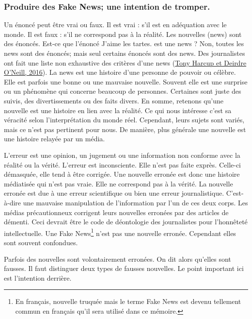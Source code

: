 \subsubsection{Produire des Fake News; une intention de tromper.}

Un énoncé peut être vrai ou faux.
Il est vrai : s'il est en adéquation avec le monde.
Il est faux : s'il ne correspond pas à la réalité.
Les nouvelles (news) sont des énoncés.
Est-ce que l'énoncé \og J'aime les tartes. \fg  est une news ?
Non, toutes les news sont des énoncés; mais seul certains énoncés sont des news. Des journalistes ont fait une liste non exhaustive des critères d'une news (\href{http://www.tandfonline.com/doi/full/10.1080/1461670X.2016.1150193}{Tony Harcup et Deirdre O’Neill, 2016}).
La news est une histoire d'une personne de pouvoir ou célèbre.
Elle est parfois une bonne ou une mauvaise nouvelle.
Souvent elle est une surprise ou un phénomène qui concerne beaucoup de personnes.
Certaines sont juste des suivis, des divertissements ou des faits divers.
En somme, retenons qu'une nouvelle est une histoire en lien avec la réalité.
Ce qui nous intéresse c'est sa véracité selon l'interprétation du monde réel.
Cependant, leurs sujets sont variés, mais ce n'est pas pertinent pour nous.
De manière, plus générale une nouvelle est une histoire relayée par un média.

L'erreur est une opinion, un jugement ou une information non conforme avec la réalité ou la vérité.
L'erreur est inconsciente.
Elle n'est pas faite exprès.
Celle-ci démasquée, elle tend à être corrigée.
Une nouvelle erronée est donc une histoire médiatisée qui n'est pas vraie.
Elle ne correspond pas à la vérité.
La nouvelle erronée est due à une erreur scientifique ou bien une erreur journalistique.
C'est-à-dire une mauvaise manipulation de l'information par l'un de ces deux corps.
Les médias précautionneux corrigent leurs nouvelles erronées par des articles de démenti.
Ceci devrait être le code de déontologie des journalistes pour l'honnêteté intellectuelle.
Une Fake News\footnote{En français, nouvelle truquée mais le terme Fake News est devenu tellement commun
en français qu'il sera utilisé dans ce mémoire.} n'est pas une nouvelle erronée.
Cependant elles sont souvent confondues.

Parfois des nouvelles sont volontairement erronées.
On dit alors qu'elles sont fausses.
Il faut distinguer deux types de fausses nouvelles.
Le point important ici est l'intention derrière.

